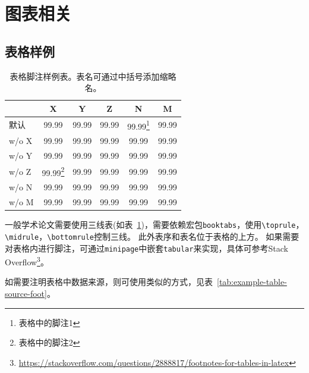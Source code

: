 \section{图表相关}
\label{sec:table-figure}

\subsection{表格样例}
\label{sec:table-example}

\begin{table}[htb]
    \centering
    \begin{minipage}[t]{0.55\linewidth} %
        \caption[表格脚注样例表]{表格脚注样例表。表名可通过中括号添加缩略名。}
        \label{tab:example-table-basic}
        \begin{small}
        \begin{tabular}{@{}lccccc@{}}
         \toprule[1.5pt]
         & \textbf{X} & \textbf{Y} & \textbf{Z} & \textbf{N} & \textbf{M} \\
         \midrule[1pt]
            默认        & 99.99 & 99.99 & 99.99 & 99.99\footnote{表格中的脚注1} & 99.99 \\
          \quad w/o X   & 99.99 & 99.99 & 99.99 & 99.99 & 99.99 \\
          \quad w/o Y   & 99.99 & 99.99 & 99.99 & 99.99 & 99.99 \\
          \quad w/o Z   & 99.99\footnote{表格中的脚注2} & 99.99 & 99.99 & 99.99 & 99.99 \\
          \quad w/o N   & 99.99 & 99.99 & 99.99 & 99.99 & 99.99 \\
          \quad w/o M   & 99.99 & 99.99 & 99.99 & 99.99 & 99.99 \\
          \bottomrule[1.5pt]
        \end{tabular}
        \end{small}
    \end{minipage}
\end{table}

一般学术论文需要使用三线表(如表~\ref{tab:example-table-basic})，需要依赖宏包\verb|booktabs|，使用\verb|\toprule|，\verb|\midrule|，\verb|\bottomrule|控制三线。
此外表序和表名位于表格的上方。
如果需要对表格内进行脚注，可通过\texttt{minipage}中嵌套\texttt{tabular}来实现，具体可参考Stack Overflow\footnote{\url{https://stackoverflow.com/questions/2888817/footnotes-for-tables-in-latex}}。

如需要注明表格中数据来源，则可使用类似的方式，见表~\ref{tab:example-table-source-foot}。

